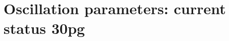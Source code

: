\documentclass[preprint,12pt]{elsarticle}
\begin{document}



\section{Oscillation parameters: current status 30pg}
\label{sec:status}




























%







\end{document}

